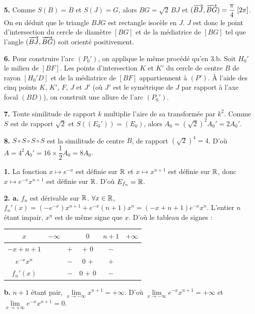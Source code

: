 \documentclass[11pt]{article}
\begin{document}
\textbf{5.} Comme $S(B) = B$ et $S(J) = G$, alors $BG = \sqrt{2}\,BJ$ et $(\vv{BJ}, \vv{BG}) = \dfrac{\pi}{4}\ [2\pi]$. On en déduit que le triangle $BJG$ est rectangle isocèle en $J$. $J$ est donc le point d'intersection du cercle de diamètre $[BG]$ et de la médiatrice de $[BG]$ tel que l'angle $(\overrightarrow{BJ}, \overrightarrow{BG})$ soit orienté positivement.

\textbf{6.} Pour construire l'arc $(P_0')$, on applique le même procédé qu'en 3.b. Soit $H_0'$ le milieu de $[BF]$. Les points d'intersection $K$ et $K'$ du cercle de centre $B$ de rayon $[H_0'D]$ et de la médiatrice de $[BF]$ appartiennent à $(P')$. À l'aide des cinq points $K$, $K'$, $F$, $J$ et $J'$ (où $J'$ est le symétrique de $J$ par rapport à l'axe focal $(BD)$), on construit une allure de l'arc $(P_0')$.

\textbf{7.} Toute similitude de rapport $k$ multiplie l'aire de sa transformée par $k^2$. Comme $S$ est de rapport $\sqrt{2}$ et $S((E_0')) = (E_0)$, alors $A_0 = (\sqrt{2})^2 A_0' = 2A_0'$.

\textbf{8.} $S \circ S \circ S \circ S$ est la similitude de centre $B$, de rapport $(\sqrt{2})^4 = 4$. D'où $A = 4^2 A_0' = 16 \times \dfrac{1}{2}A_0 = 8A_0$.


\textbf{1.} La fonction $x \mapsto e^{-x}$ est définie sur $\mathbb{R}$ et $x \mapsto x^{n+1}$ est définie sur $\mathbb{R}$, donc $x \mapsto e^{-x}x^{n+1}$ est définie sur $\mathbb{R}$. D'où $E_{f_n} = \mathbb{R}$.

\textbf{2. a.} $f_n$ est dérivable sur $\mathbb{R}$. $\forall x \in \mathbb{R}$, $f_n'(x) = (-e^{-x})x^{n+1} + e^{-x}(n+1)x^n = (-x + n + 1)e^{-x}x^n$. L'entier $n$ étant impair, $x^n$ est de même signe que $x$. D'où le tableau de signes :
\begin{center}\renewcommand{\arraystretch}{1.4}
\begin{tabular}{|c|ccccc|}
\hline
$x$ & $-\infty$ & & $0$ & $n+1$ & $+\infty$ \\
\hline
$-x + n + 1$ & & $+$ & $+$ \quad $0$ & $-$ & \\
\hline
$e^{-x}x^n$ & & $-$ & $0$ \quad $+$ & $+$ & \\
\hline
$f_n'(x)$ & & $-$ & $0$ \quad $+$ \quad $0$ & $-$ & \\
\hline
\end{tabular}
\end{center}

\textbf{b.} $n + 1$ étant pair, $\lim\limits_{x\to-\infty} x^{n+1} = +\infty$. D'où $\lim\limits_{x\to-\infty} e^{-x}x^{n+1} = +\infty$ et $\lim\limits_{x\to+\infty} e^{-x}x^{n+1} = 0$.
\end{document}
